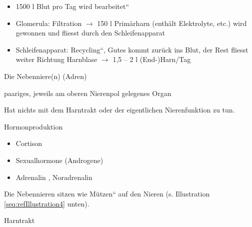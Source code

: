 \documentclass{article}
\begin{document}
\begin{itemize}
\item 1500 l Blut pro Tag wird
{\quotedblbase}bearbeitet{\textquotedblleft}

\item Glomerula: Filtration ${\rightarrow}$ 150  l
Prim\"arharn (enth\"alt Elektrolyte, etc.) wird
gewonnen und fliesst durch den Schleifenapparat

\item Schleifenapparat: {\quotedblbase}Recycling{\textquotedblleft},
Gutes kommt zur\"uck ins Blut, der Rest fliesst weiter Richtung
Harnblase ${\rightarrow}$ 1,5 -- 2  l (End-)Harn/Tag 

\end{itemize}
Die Nebenniere(n) (Adren)

paariges, jeweils am oberen Nierenpol gelegenes Organ

Hat nichts  mit dem Harntrakt oder der eigentlichen Nierenfunktion zu
tun.

Hormonproduktion

\begin{itemize}
\item Cortison

\item Sexualhormone (Androgene)

\item Adrenalin , Noradrenalin

\end{itemize}
Die Nebennieren sitzen wie {\quotedblbase}M\"utzen{\textquotedblleft}
auf den Nieren (s. Illustration \ref{seq:refIllustration4} unten). 

Harntrakt
\end{document}
